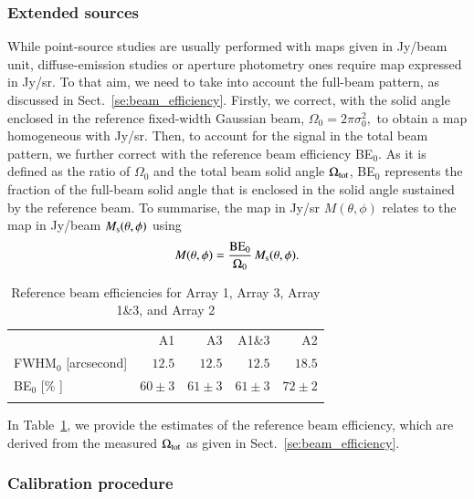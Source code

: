 \documentclass[traditionalabstract]{aa}
\newcommand{\rev}[1]{#1}
\begin{document}
{\subsubsection{Extended sources}
\label{se:extended_source_calib}

{\rev While point-source studies are usually performed with maps given in
Jy/beam unit, diffuse-emission studies or aperture photometry ones
require map expressed in Jy/sr. To that aim, we need to take into
account the full-beam pattern, as discussed in Sect.~\ref{se:beam_efficiency}.}
Firstly, we correct, with the solid angle enclosed in the
reference fixed-width Gaussian beam, $\Omega_{0} = 2\pi \sigma_0^2,$ to
obtain a map homogeneous with Jy/sr. Then, to account for the signal in
the total beam pattern, we further correct with the reference beam
efficiency BE$_{0}$. As it is defined as the ratio of $\Omega_{0}$ and the
total beam solid angle $\Omega_{\rm{tot}}$, BE$_{0}$ represents the
fraction of the full-beam solid angle that is enclosed in the solid
angle sustained by the reference beam. To summarise, the map in Jy/sr
$M(\theta, \phi)$ relates to the map in Jy/beam
$M_{\rm{s}}(\theta, \phi)$ using
%
\begin{equation}
M(\theta, \phi) = \frac{\rm{BE}_{0}}{\Omega_{0}} \, M_{\rm{s}}(\theta, \phi).
\label{eq:jybeam_to_jysr}
\end{equation}
%
\begin{table}[!htbp]
  \caption[]{Reference beam efficiencies for Array 1, Array 3, Array 1\&3, and Array 2}
  \label{tab:reference_beam_efficiency}
  \centering    
  \begin{tabular}{lrrrr}
    \hline\hline
    \noalign{\smallskip}
    & A1 & A3  & A1\&3 & A2 \\
    \noalign{\smallskip}
    \hline
    \noalign{\smallskip}
    FWHM$_{0}$ [arcsecond]          & $12.5$     &  $12.5$     & $12.5$     & $18.5$     \\
    BE$_{0}$   [\% ]             & $60 \pm 3$ &  $61 \pm 3$ & $61 \pm 3$ & $72 \pm 2$ \\
        \noalign{\smallskip}
    \hline
  \end{tabular}
\end{table}
%
{\rev In Table~\ref{tab:reference_beam_efficiency}, we provide the
estimates of the reference beam efficiency, which are derived from the
measured $\Omega_{\rm{tot}}$ as given in
Sect.~\ref{se:beam_efficiency}.}

\subsubsection{Calibration procedure}
\label{se:practical_calib}

}
\end{document}
